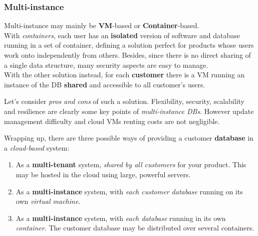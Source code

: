 \subsubsection{Multi-instance}
Multi-instance may mainly be \textbf{VM}-based or \textbf{Container}-based.\\
With \textit{containers}, each user has an \textbf{isolated} version of software and database running in a set of container,
defining a solution perfect for products whose users work onto independently from others.
Besides, since there is no direct sharing of a single data structure, 
many security aspects are easy to manage.\\
With the other solution instead, for each \textbf{customer} there is a VM running an instance of the DB \textbf{shared} and accessible to all customer's users.\nl

Let's consider \textit{pros and cons} of such a solution.
Flexibility, security, scalability and resilience are clearly some key points of \textit{multi-instance DBs}.
However update management difficulty and cloud VMs renting costs are not negligible.

Wrapping up,
there are three possible ways of
providing a customer \textbf{database} in
a \textit{cloud-based} system:
\begin{enumerate}
   \item As a \textbf{multi-tenant} system, \textit{shared by all customers} for your product.
   This may be hosted in the cloud using large, powerful servers. 
   \item As a \textbf{multi-instance} system, with \textit{each customer database} running on its own \textit{virtual machine}. 
   \item As a \textbf{multi-instance} system, with \textit{each database} running in its own \textit{container}.
   The customer database may be distributed over several containers.
\end{enumerate}

